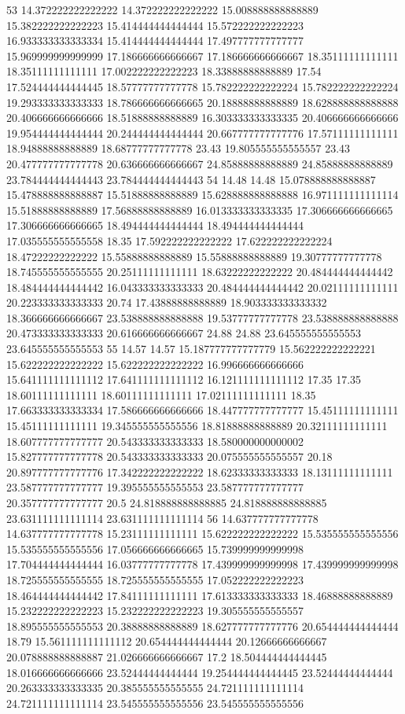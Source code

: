 53 14.372222222222222 14.372222222222222 15.008888888888889 15.382222222222223 15.414444444444444 15.572222222222223 16.933333333333334 15.414444444444444 17.497777777777777 15.969999999999999 17.186666666666667 17.186666666666667 18.35111111111111 18.35111111111111 17.002222222222223 18.33888888888889 17.54 17.524444444444445 18.57777777777778 15.782222222222224 15.782222222222224 19.293333333333333 18.786666666666665 20.18888888888889 18.628888888888888 20.406666666666666 18.51888888888889 16.303333333333335 20.406666666666666 19.954444444444444 20.244444444444444 20.667777777777776 17.57111111111111 18.94888888888889 18.68777777777778 23.43 19.805555555555557 23.43 20.477777777777778 20.636666666666667 24.85888888888889 24.85888888888889 23.784444444444443 23.784444444444443
54 14.48 14.48 15.078888888888887 15.478888888888887 15.51888888888889 15.628888888888888 16.971111111111114 15.51888888888889 17.56888888888889 16.013333333333335 17.306666666666665 17.306666666666665 18.494444444444444 18.494444444444444 17.035555555555558 18.35 17.592222222222222 17.622222222222224 18.47222222222222 15.55888888888889 15.55888888888889 19.30777777777778 18.745555555555555 20.25111111111111 18.63222222222222 20.484444444444442 18.484444444444442 16.043333333333333 20.484444444444442 20.02111111111111 20.223333333333333 20.74 17.43888888888889 18.903333333333332 18.366666666666667 23.538888888888888 19.53777777777778 23.538888888888888 20.473333333333333 20.616666666666667 24.88 24.88 23.645555555555553 23.645555555555553
55 14.57 14.57 15.187777777777779 15.562222222222221 15.622222222222222 15.622222222222222 16.996666666666666 15.641111111111112 17.641111111111112 16.121111111111112 17.35 17.35 18.60111111111111 18.60111111111111 17.02111111111111 18.35 17.663333333333334 17.586666666666666 18.447777777777777 15.45111111111111 15.45111111111111 19.345555555555556 18.81888888888889 20.32111111111111 18.607777777777777 20.543333333333333 18.580000000000002 15.827777777777778 20.543333333333333 20.075555555555557 20.18 20.897777777777776 17.342222222222222 18.62333333333333 18.13111111111111 23.587777777777777 19.395555555555553 23.587777777777777 20.357777777777777 20.5 24.818888888888885 24.818888888888885 23.631111111111114 23.631111111111114
56 14.637777777777778 14.637777777777778 15.23111111111111 15.622222222222222 15.535555555555556 15.535555555555556 17.056666666666665 15.739999999999998 17.704444444444444 16.03777777777778 17.439999999999998 17.439999999999998 18.725555555555555 18.725555555555555 17.052222222222223 18.464444444444442 17.84111111111111 17.613333333333333 18.46888888888889 15.232222222222223 15.232222222222223 19.305555555555557 18.895555555555553 20.38888888888889 18.627777777777776 20.654444444444444 18.79 15.561111111111112 20.654444444444444 20.12666666666667 20.078888888888887 21.026666666666667 17.2 18.504444444444445 18.016666666666666 23.52444444444444 19.254444444444445 23.52444444444444 20.263333333333335 20.385555555555555 24.721111111111114 24.721111111111114 23.545555555555556 23.545555555555556

